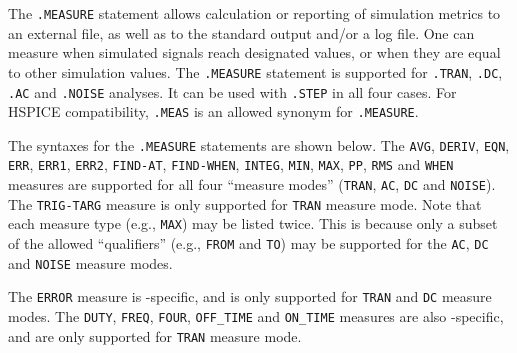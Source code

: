 


The \texttt{.MEASURE} statement allows calculation or reporting of simulation 
metrics to an external file, as well as to the standard output and/or a log file.  One can 
measure when simulated signals reach designated values, or when they are equal
to other simulation values.  The \texttt{.MEASURE} statement is supported for 
\texttt{.TRAN}, \texttt{.DC}, \texttt{.AC} and \texttt{.NOISE} analyses.  It can
be used with {\tt .STEP}  in all four cases.  For HSPICE compatibility,
\texttt{.MEAS} is an allowed synonym for \texttt{.MEASURE}.

The syntaxes for the \texttt{.MEASURE} statements are shown below.  The \texttt{AVG},
\texttt{DERIV}, \texttt{EQN},   \texttt{ERR},  \texttt{ERR1}, \texttt{ERR2}, \texttt{FIND-AT},
\texttt{FIND-WHEN}, \texttt{INTEG}, \texttt{MIN}, \texttt{MAX}, \texttt{PP}, \texttt{RMS}
and \texttt{WHEN} measures are supported for all four ``measure modes'' (\texttt{TRAN}, 
\texttt{AC}, \texttt{DC} and \texttt{NOISE}).  The \texttt{TRIG-TARG} measure is only supported for
\texttt{TRAN} measure mode.  Note that each measure type (e.g., \texttt{MAX}) may be listed
twice. This is because only a subset of the allowed ``qualifiers'' (e.g., \texttt{FROM} and
\texttt{TO}) may be supported for the \texttt{AC}, \texttt{DC} and \texttt{NOISE} measure modes.

The \texttt{ERROR} measure is \Xyce{}-specific, and is only supported for \texttt{TRAN} and
\texttt{DC} measure modes.  The \texttt{DUTY}, \texttt{FREQ}, \texttt{FOUR}, \texttt{OFF\_TIME}
and \texttt{ON\_TIME} measures are also \Xyce{}-specific, and are  only supported for
\texttt{TRAN} measure mode.

